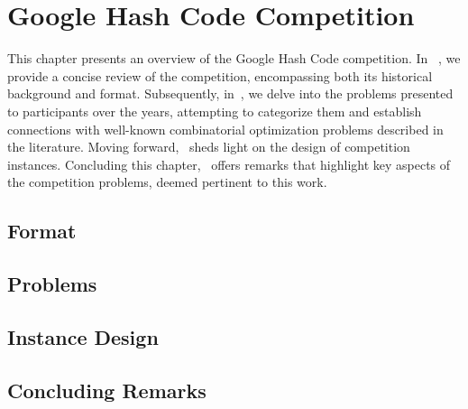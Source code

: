 \chapter{Google Hash Code Competition}
\label{ch:hashcode-problems}


This chapter presents an overview of the Google Hash Code competition. In
~, we provide a concise review of the competition,
encompassing both its historical background and format. Subsequently,
in~, we delve into the problems presented to
participants over the years, attempting to categorize them and establish
connections with well-known combinatorial optimization problems described in the
literature. Moving forward,~ sheds light on the
design of competition instances. Concluding this
chapter,~ offers remarks that highlight key aspects
of the competition problems, deemed pertinent to this work.

\section{Format}
\label{sec:hashcode-format}


\section{Problems}
\label{sec:hashcode-problems}


\section{Instance Design}
\label{sec:hashcode-instance}


\section{Concluding Remarks}
\label{sec:hashcode-remarks}
